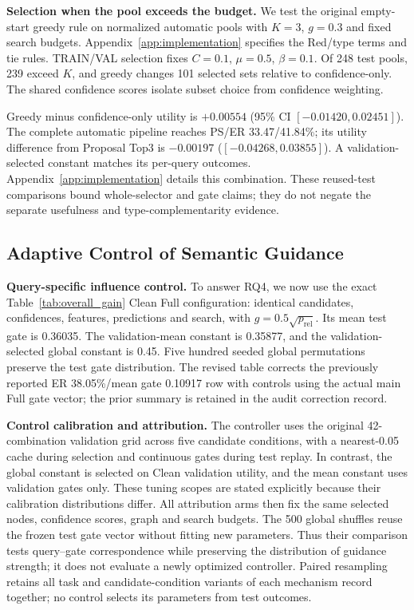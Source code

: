 \documentclass{article} %
\newcommand{\rev}[1]{{\color{blue}#1}}
\begin{document}
\noindent\textbf{Selection when the pool exceeds the budget.}
We test the original empty-start greedy rule on normalized automatic pools with $K=3$, $g=0.3$ and fixed search budgets. Appendix~\ref{app:implementation} specifies the Red/type terms and tie rules. TRAIN/VAL selection fixes $C=0.1$, $\mu=0.5$, $\beta=0.1$. \rev{Of 248 test pools, 239 exceed $K$, and greedy changes 101 selected sets relative to confidence-only.} The shared confidence scores isolate subset choice from confidence weighting.



\rev{Greedy minus confidence-only utility is $+0.00554$ (95\% CI $[-0.01420,0.02451]$). The complete automatic pipeline reaches PS/ER 33.47/41.84\%; its utility difference from Proposal Top3 is $-0.00197$ ($[-0.04268,0.03855]$). A validation-selected constant matches its per-query outcomes.} Appendix~\ref{app:implementation} details this combination. \rev{These reused-test comparisons bound whole-selector and gate claims; they do not negate the separate usefulness and type-complementarity evidence.}


\subsection{Adaptive Control of Semantic Guidance}
\label{sec:stage3}
\textbf{Query-specific influence control.} To answer RQ4, we now use the exact Table~\ref{tab:overall_gain} Clean Full configuration: identical candidates, confidences, features, predictions and search, with $g=0.5\sqrt{p_{\mathrm{rel}}}$. \rev{Its mean test gate is 0.36035. The validation-mean constant is 0.35877, and the validation-selected global constant is 0.45.} Five hundred seeded global permutations preserve the test gate distribution. The revised table corrects the previously reported \rev{ER 38.05\%/mean gate 0.10917} row with controls using the actual main Full gate vector; the prior summary is retained in the audit correction record.
\vspace{-0.15em}

\noindent\textbf{Control calibration and attribution.}
The controller uses the original 42-combination validation grid across five candidate conditions, with a nearest-0.05 cache during selection and continuous gates during test replay. In contrast, the global constant is selected on Clean validation utility, and the mean constant uses validation gates only. These tuning scopes are stated explicitly because their calibration distributions differ. All attribution arms then fix the same selected nodes, confidence scores, graph and search budgets. The 500 global shuffles reuse the frozen test gate vector without fitting new parameters. Thus their comparison tests query--gate correspondence while preserving the distribution of guidance strength; it does not evaluate a newly optimized controller. Paired resampling retains all task and candidate-condition variants of each mechanism record together; no control selects its parameters from test outcomes.
\end{document}
